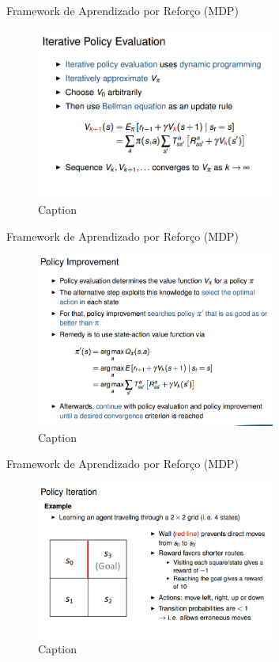\begin{frame}{Framework de Aprendizado por Reforço (MDP)}
    \begin{figure}
        \centering
        \includegraphics[width=0.7\textwidth]{img/iterativePolicyEvaluation.png}
        \caption{Caption}
        \label{fig:my_label}
    \end{figure}
\end{frame}

\begin{frame}{Framework de Aprendizado por Reforço (MDP)}
    \begin{figure}
        \centering
        \includegraphics[width=0.7\textwidth]{img/policyImprovement.png}
        \caption{Caption}
        \label{fig:my_label}
    \end{figure}
\end{frame}

\begin{frame}{Framework de Aprendizado por Reforço (MDP)}
    \begin{figure}
        \centering
        \includegraphics[width=0.7\textwidth]{img/policyIterationExample.png}
        \caption{Caption}
        \label{fig:my_label}
    \end{figure}
\end{frame}

